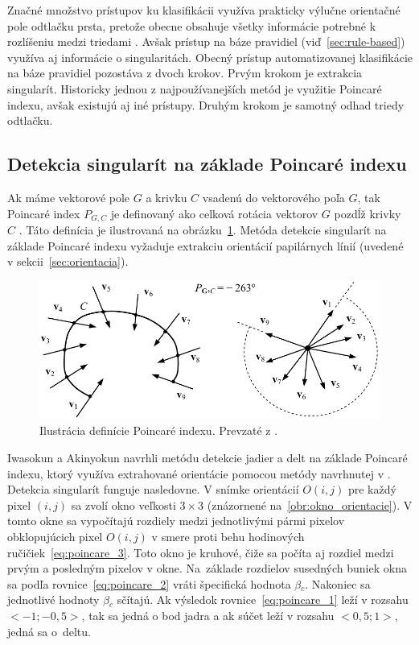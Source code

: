   Značné množstvo prístupov ku klasifikácii využíva prakticky výlučne orientačné pole odtlačku prsta, pretože obecne obsahuje všetky informácie potrebné
  k rozlíšeniu medzi triedami \cite{Handbook}. Avšak prístup na báze pravidiel (viď~{\ref{sec:rule-based}}) využíva aj informácie o singularitách.
  Obecný prístup automatizovanej klasifikácie na báze pravidiel pozostáva z dvoch krokov. Prvým krokom je extrakcia singularít. Historicky jednou
  z najpoužívanejších metód je využitie Poincaré indexu, avšak existujú aj iné prístupy. Druhým krokom je samotný odhad triedy odtlačku.

  \subsection{Detekcia singularít na základe Poincaré indexu}
  Ak máme vektorové pole $G$ a krivku $C$ vsadenú do vektorového poľa $G$, tak Poincaré index $P_{G,C}$ je definovaný ako celková rotácia vektorov $G$ pozdĺž
  krivky $C$ \cite{Handbook}. Táto definícia je ilustrovaná na obrázku~{\ref{obr:poincare_index}}. Metóda detekcie singularít na základe Poincaré indexu vyžaduje
  extrakciu orientácií papilárnych línií (uvedené v sekcii~{\ref{sec:orientacia}}).

  \begin{figure}[h]
    \centering
    \includegraphics[width=0.65\linewidth]{obrazky-figures/poincare_index.png}
    \caption{Ilustrácia definície Poincaré indexu. Prevzaté z \cite{Handbook}.}
    \label{obr:poincare_index}
  \end{figure}

  Iwasokun a Akinyokun \cite{iwasokun2014singularities} navrhli metódu detekcie jadier a delt na základe Poincaré indexu, ktorý využíva extrahované orientácie
  pomocou metódy navrhnutej v \cite{Hong}. Detekcia singularít funguje nasledovne. V snímke orientácií $O(i,j)$ pre každý pixel $(i,j)$ sa zvolí
  okno veľkosti $3\times{}3$ (znázornené na~{\ref{obr:okno_orientacie}}). V tomto okne sa vypočítajú rozdiely medzi jednotlivými pármi pixelov
  obklopujúcich pixel $O(i,j)$ v smere proti behu hodinových ručičiek~{\ref{eq:poincare_3}}. Toto okno je kruhové, čiže sa počíta aj rozdiel medzi prvým
  a posledným pixelov v okne. Na~základe rozdielov susedných buniek okna sa podľa rovnice~{\ref{eq:poincare_2}} vráti špecifická hodnota $\beta{}_c$.
  Nakoniec sa jednotlivé
  hodnoty $\beta{}_c$ sčítajú. Ak výsledok rovnice~{\ref{eq:poincare_1}} leží v rozsahu \mbox{$<-1;-0,5>$}, tak sa jedná o bod jadra a ak súčet leží
  v rozsahu \mbox{$<0,5;1>$}, jedná sa o~deltu.


